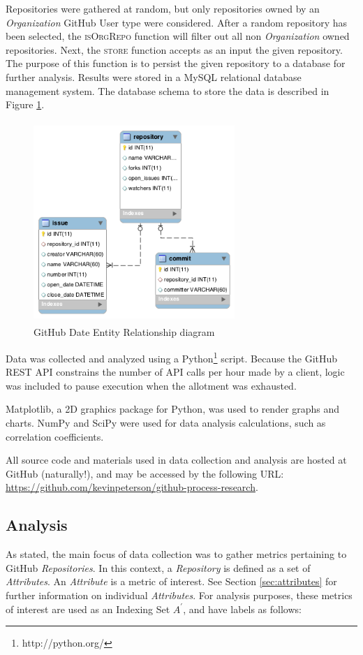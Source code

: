 \documentclass{proc}
\begin{document}
Repositories were gathered at random, but only repositories owned by an \textit{Organization} GitHub User type were considered. After a random repository has been selected, the \textsc{isOrgRepo} function will filter out all non \textit{Organization} owned repositories. Next, the \textsc{store} function accepts as an input the given repository. The purpose of this function is to persist the given repository to a database for further analysis. Results were stored in a MySQL relational database management system. The database schema to store the data is described in Figure \ref{fig:er_diagram}.

\begin{figure}
\includegraphics[height=3in,width=3in]{images/er.png}
\caption{GitHub Date Entity Relationship diagram}
\label{fig:er_diagram}
\end{figure}

Data was collected and analyzed using a Python\footnote{http://python.org/} script. Because the GitHub REST API constrains the number of API calls per hour made by a client, logic was included to pause execution when the allotment was exhausted.

Matplotlib\cite{Hunter2007}, a 2D graphics package for Python, was used to render graphs and charts. NumPy and SciPy\cite{scipy} were used for data analysis calculations, such as correlation coefficients.

All source code and materials used in data collection and analysis are hosted at GitHub (naturally!), and may be accessed by the following URL: \url{https://github.com/kevinpeterson/github-process-research}.

\subsection{Analysis}
As stated, the main focus of data collection was to gather metrics pertaining to GitHub \textit{Repositories}. In this context, a \textit{Repository} is defined as a set of \textit{Attributes}. An \textit{Attribute} is a metric of interest. See Section \ref{sec:attributes} for further information on individual \textit{Attributes}. For analysis purposes, these metrics of interest are used as an Indexing Set $A^\prime$, and have labels as follows:
\end{document}
